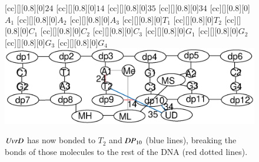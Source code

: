 \begin{figure}[h!]
[cc][][0.8][0]{$24$}
[cc][][0.8][0]{$14$}
[cc][][0.8][0]{$35$}
[cc][][0.8][0]{$34$}
[cc][][0.8][0]{${A_1}$}
[cc][][0.8][0]{${A_2}$}
[cc][][0.8][0]{${A_3}$}
[cc][][0.8][0]{${T_1}$}
[cc][][0.8][0]{${T_2}$}
[cc][][0.8][0]{${C_1}$}
[cc][][0.8][0]{${C_2}$}
[cc][][0.8][0]{${C_3}$}
[cc][][0.8][0]{${G_1}$}
[cc][][0.8][0]{${G_2}$}
[cc][][0.8][0]{${G_3}$}
[cc][][0.8][0]{${G_4}$}
  \centering
    \includegraphics[width=1.0\textwidth]{mmr/state3}
  \caption[A six base pair DNA fragment.]{%
  $\mathit{UvrD}$ has now bonded to $T_2$ and $\mathit{DP}_{10}$ (blue lines), breaking the bonds of those molecules to the rest of the DNA (red dotted lines). %
}
  \label{fig:state3}
\end{figure}

